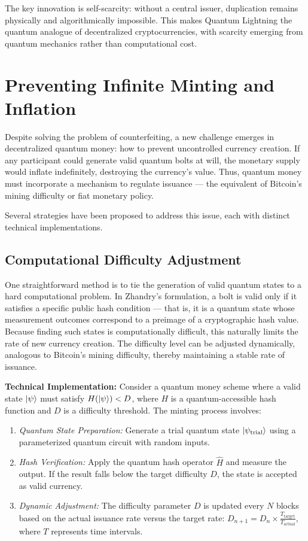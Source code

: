 \documentclass[a4paper,10.5pt,twoside]{article}
\begin{document}
The key innovation is self-scarcity: without a central issuer, duplication remains physically and algorithmically impossible. This makes Quantum Lightning the quantum analogue of decentralized cryptocurrencies, with scarcity emerging from quantum mechanics rather than computational cost.

\section{Preventing Infinite Minting and Inflation}\label{s:3}
Despite solving the problem of counterfeiting, a new challenge emerges in decentralized quantum money: how to prevent uncontrolled currency creation. If any participant could generate valid quantum bolts at will, the monetary supply would inflate indefinitely, destroying the currency's value. Thus, quantum money must incorporate a mechanism to regulate issuance — the equivalent of Bitcoin's mining difficulty or fiat monetary policy.

Several strategies have been proposed to address this issue, each with distinct technical implementations.

\subsection{Computational Difficulty Adjustment}\label{s:3.1}
One straightforward method is to tie the generation of valid quantum states to a hard computational problem. In Zhandry's formulation,\autocite{Zhandry_2019} a bolt is valid only if it satisfies a specific public hash condition — that is, it is a quantum state whose measurement outcomes correspond to a preimage of a cryptographic hash value. Because finding such states is computationally difficult, this naturally limits the rate of new currency creation. The difficulty level can be adjusted dynamically, analogous to Bitcoin's mining difficulty, thereby maintaining a stable rate of issuance.

\textbf{Technical Implementation:} Consider a quantum money scheme where a valid state $\ket{\psi}$ must satisfy $H(\ket{\psi}) < D$, where $H$ is a quantum-accessible hash function and $D$ is a difficulty threshold. The minting process involves:
\begin{enumerate}
\item \textit{Quantum State Preparation:} Generate a trial quantum state $\ket{\psi_{\text{trial}}}$ using a parameterized quantum circuit with random inputs.
\item \textit{Hash Verification:} Apply the quantum hash operator $\hat{H}$ and measure the output. If the result falls below the target difficulty $D$, the state is accepted as valid currency.
\item \textit{Dynamic Adjustment:} The difficulty parameter $D$ is updated every $N$ blocks based on the actual issuance rate versus the target rate: $D_{n+1} = D_n \times \frac{T_{\text{target}}}{T_{\text{actual}}}$, where $T$ represents time intervals.
\end{enumerate}
\end{document}
